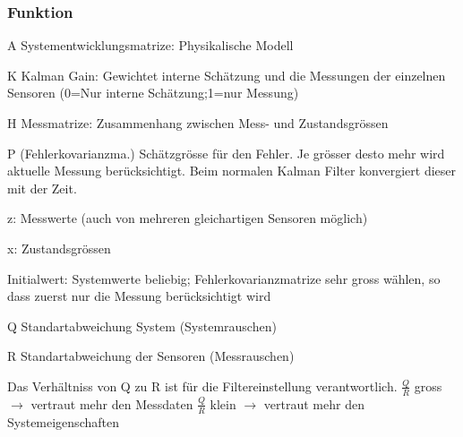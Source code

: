 \begin{minipage}{11cm}
	\small
	\subsubsection{Funktion}
		\begin{liste}
	    	\item A Systementwicklungsmatrize: Physikalische Modell
	    	\item K Kalman Gain: Gewichtet interne Schätzung und die Messungen der
	    	einzelnen Sensoren (0=Nur interne Schätzung;1=nur Messung)
	    	\item H Messmatrize: Zusammenhang zwischen Mess- und Zustandsgrössen
	    	\item P (Fehlerkovarianzma.) Schätzgrösse für den Fehler. Je grösser desto
	    	mehr wird aktuelle Messung berücksichtigt. Beim normalen Kalman Filter
	    	konvergiert dieser mit der Zeit.
	    	\item z: Messwerte (auch von mehreren gleichartigen Sensoren möglich)
	    	\item x: Zustandsgrössen
	    	\item Initialwert: Systemwerte beliebig; Fehlerkovarianzmatrize sehr
	    	gross wählen, so dass zuerst nur die Messung berücksichtigt wird
	    	\item Q Standartabweichung System (Systemrauschen)
	    	\item R Standartabweichung der Sensoren (Messrauschen)
				\item Das Verhältniss von Q zu R ist für die Filtereinstellung verantwortlich.\newline
				$\frac QR$ gross $\rightarrow$ vertraut mehr den Messdaten\newline \hspace{4cm} $\frac QR$ klein $\rightarrow$ vertraut mehr den Systemeigenschaften
	    \end{liste}
	\normalsize
\end{minipage}


